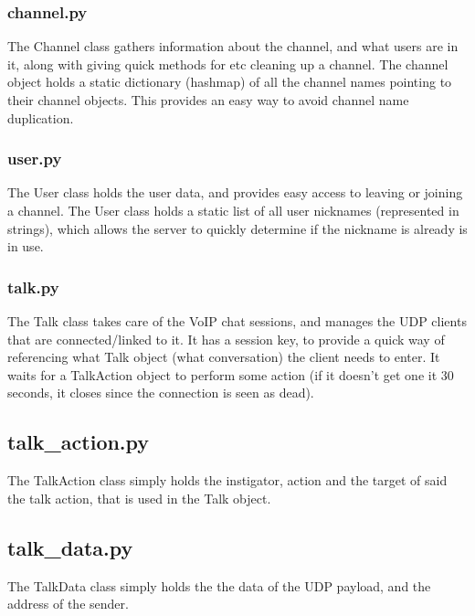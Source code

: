 \documentclass[12pt]{rapport}
\begin{document}
\subsubsection*{channel.py}
The Channel class gathers information about the channel, and what
users are in it, along with giving quick methods for etc cleaning up a
channel. The channel object holds a static dictionary (hashmap) of all
the channel names pointing to their channel objects. This provides an
easy way to avoid channel name duplication.

\subsubsection*{user.py}
The User class holds the user data, and provides easy access to
leaving or joining a channel. The User class holds a static list of
all user nicknames (represented in strings), which allows the server
to quickly determine if the nickname is already is in use.

\subsubsection*{talk.py}
The Talk class takes care of the VoIP chat sessions, and manages the
UDP clients that are connected/linked to it. It has a session key, to
provide a quick way of referencing what Talk object (what
conversation) the client needs to enter. It waits for a TalkAction
object to perform some action (if it doesn't get one it 30 seconds, it
closes since the connection is seen as dead).

\subsection*{talk\_action.py}
The TalkAction class simply holds the instigator, action and the target
of said the talk action, that is used in the Talk object.

\subsection*{talk\_data.py}
The TalkData class simply holds the the data of the UDP payload, and
the address of the sender.
\end{document}
